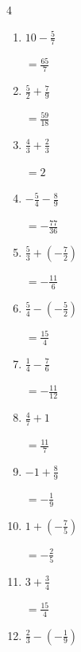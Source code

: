 \begin{multicols}{4}
\begin{enumerate}
        $\displaystyle =\frac{3}{4}$

\columnbreak %

  \item $\displaystyle 10 - \frac{5}{7}$

        $\displaystyle =\frac{65}{7}$

  \item $\displaystyle \frac{5}{2} + \frac{7}{9}$

        $\displaystyle =\frac{59}{18}$

  \item $\displaystyle \frac{4}{3} + \frac{2}{3}$

        $\displaystyle =2$

  \item $\displaystyle -\frac{5}{4} - \frac{8}{9}$

        $\displaystyle =-\frac{77}{36}$

  \item $\displaystyle \frac{5}{3} + \left(-\frac{7}{2}\right)$

        $\displaystyle =-\frac{11}{6}$

  \item $\displaystyle \frac{5}{4} - \left(-\frac{5}{2}\right)$

        $\displaystyle =\frac{15}{4}$

  \item $\displaystyle \frac{1}{4} - \frac{7}{6}$

        $\displaystyle =-\frac{11}{12}$

  \item $\displaystyle \frac{4}{7} + 1$

        $\displaystyle =\frac{11}{7}$

  \item $\displaystyle -1 + \frac{8}{9}$

        $\displaystyle =-\frac{1}{9}$

  \item $\displaystyle 1 + \left(-\frac{7}{5}\right)$

        $\displaystyle =-\frac{2}{5}$

\columnbreak %

  \item $\displaystyle 3 + \frac{3}{4}$

        $\displaystyle =\frac{15}{4}$

  \item $\displaystyle \frac{2}{3} - \left(-\frac{1}{9}\right)$


\end{enumerate}
\end{multicols}
